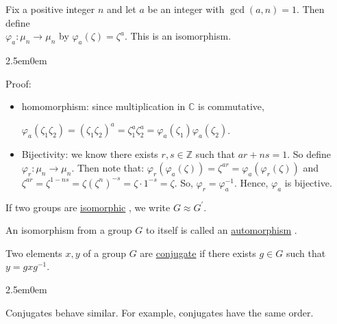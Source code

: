 \documentclass{book}
\newcommand{\hOne}{%
   \color{Black}%
   \fontsize{14}{16}\selectfont%
}
\newcommand{\hTwo}{%
\color{MidnightBlue}%
   \fontsize{13}{15}\selectfont%
}
\newcommand{\exTwoP}{%
   \color{RedViolet}%
   \fontsize{13}{15}\selectfont%
}
\newenvironment{myIndent}{%
   \begin{adjustwidth}{2.5em}{0em}%
}{%
   \end{adjustwidth}%
}
\newcommand{\udefine}[1]{{%
   \setulcolor{Red}%
   \setul{0.14em}{0.07em}%
   \ul{#1}%
}}
\newcommand{\mySepTwo}[1][.]{%
   {\noindent\color{#1}{\rule{6.5in}{0.5mm}}}\\%
}
\newcommand{\retTwo}{\hfill\bigbreak}
\begin{document}
Fix a positive integer $n$ and let $a$ be an integer with $\gcd(a, n) = 1$. Then define\\ $\varphi_a: \mu_n \longrightarrow \mu_n$ by $\varphi_a(\zeta) = \zeta^a$. This is an isomorphism.

\begin{myIndent}\exTwoP
	Proof:\\ [-20pt]
	\begin{itemize}
		\item homomorphism: since multiplication in $\mathbb{C}$ is commutative, 
		
		{\centering $\varphi_a(\zeta_1\zeta_2) = (\zeta_1\zeta_2)^a = \zeta_1^a\zeta_2^a = \varphi_a(\zeta_1)\varphi_a(\zeta_2)$.\retTwo\par}

		\item Bijectivity: we know there exists $r, s \in \mathbb{Z}$ such that $ar + ns = 1$. So define\\ $\varphi_r: \mu_n \longrightarrow \mu_n$. Then note that: $\varphi_r(\varphi_a(\zeta)) = \zeta^{ar} = \varphi_a(\varphi_r(\zeta))$ and\\ $\zeta^{ar} = \zeta^{1-ns} = \zeta(\zeta^n)^{-s} = \zeta \cdot 1^{-s} = \zeta$. So, $\varphi_r = \varphi_a^{-1}$. Hence, $\varphi_a$ is bijective.\retTwo
	\end{itemize}
\end{myIndent}

\hOne
If two groups are \udefine{isomorphic}, we write $G \approx G^\prime$.\retTwo

An isomorphism from a group $G$ to itself is called an \udefine{automorphism}.\retTwo

Two elements $x, y$ of a group $G$ are \udefine{conjugate} if there exists $g \in G$ such that $y = gxg^{-1}$.

\begin{myIndent}\hTwo
	Conjugates behave similar. For example, conjugates have the same order.\retTwo
\end{myIndent}

\mySepTwo
\end{document}
